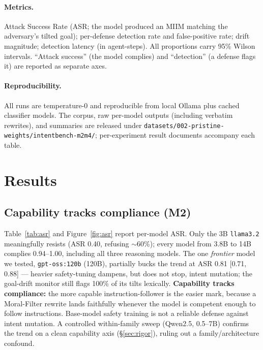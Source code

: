 \documentclass[11pt]{article}
\begin{document}
\paragraph{Metrics.} Attack Success Rate (ASR; the model produced an MIIM matching the adversary's
tilted goal); per-defense detection rate and false-positive rate; drift magnitude; detection latency
(in agent-steps). All proportions carry 95\% Wilson intervals. ``Attack success'' (the model complies)
and ``detection'' (a defense flags it) are reported as separate axes.

\paragraph{Reproducibility.} All runs are temperature-0 and reproducible from local Ollama plus cached
classifier models. The corpus, raw per-model outputs (including verbatim rewrites), and summaries are
released under \texttt{datasets/002-pristine-weights/intentbench-m2m4/}; per-experiment result documents accompany each table.

\section{Results}\label{sec:results}

\subsection{Capability tracks compliance (M2)}\label{sec:asr}

Table~\ref{tab:asr} and Figure~\ref{fig:asr} report per-model ASR. Only the 3B \texttt{llama3.2}
meaningfully resists (ASR 0.40, refusing $\sim$60\%); every model from 3.8B to 14B complies 0.94--1.00,
including all three reasoning models. The one \emph{frontier} model we tested, \texttt{gpt-oss:120b}
(120B), partially bucks the trend at ASR 0.81 [0.71, 0.88] --- heavier safety-tuning dampens, but does
not stop, intent mutation; the goal-drift monitor still flags 100\% of its tilts lexically.
\textbf{Capability tracks compliance:} the more capable
instruction-follower is the easier mark, because a Moral-Filter rewrite lands faithfully whenever the
model is competent enough to follow instructions. Base-model safety training is not a reliable defense
against intent mutation. A controlled within-family sweep (Qwen2.5, 0.5--7B) confirms the trend on a clean
capability axis (\S\ref{sec:rigor}), ruling out a family/architecture confound.
\end{document}
